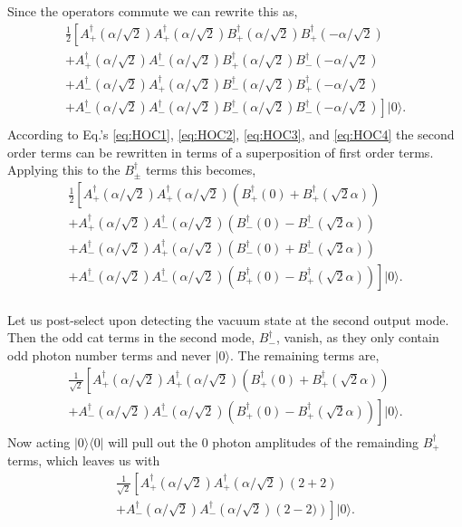 \documentclass[aps,prl,twocolumn,amsmath,amssymb,nofootinbib,superscriptaddress]{revtex4}
\newcommand{\bra}[1]{\langle#1|}
\newcommand{\ket}[1]{|#1\rangle}
\begin{document}
Since the operators commute we can rewrite this as,
\begin{eqnarray}
\frac{1}{2}\left[A_+^\dag(\alpha/\sqrt{2}) A_+^\dag(\alpha/\sqrt{2}) B_+^\dag(\alpha/\sqrt{2})  B_+^\dag(-\alpha/\sqrt{2}) \right. \nonumber \\
+ A_+^\dag(\alpha/\sqrt{2}) A_-^\dag(\alpha/\sqrt{2}) B_+^\dag(\alpha/\sqrt{2}) B_-^\dag(-\alpha/\sqrt{2}) \nonumber \\
+ A_-^\dag(\alpha/\sqrt{2})A_+^\dag(\alpha/\sqrt{2})B_-^\dag(\alpha/\sqrt{2})  B_+^\dag(-\alpha/\sqrt{2}) \nonumber \\
\left.+ A_-^\dag(\alpha/\sqrt{2}) A_-^\dag(\alpha/\sqrt{2})B_-^\dag(\alpha/\sqrt{2})B_-^\dag(-\alpha/\sqrt{2})\right] \ket{0}.\nonumber \\
\end{eqnarray}
According to Eq.'s \ref{eq:HOC1}, \ref{eq:HOC2}, \ref{eq:HOC3}, and \ref{eq:HOC4} the second order terms can be rewritten in terms of a superposition of first order terms. Applying this to the $B_{\pm}^{\dag}$ terms this becomes,
\begin{eqnarray}
\frac{1}{2}\left[A_+^\dag(\alpha/\sqrt{2}) A_+^\dag(\alpha/\sqrt{2}) \left(B_+^\dag(0)+  B_+^\dag(\sqrt{2}\alpha)\right) \right.\nonumber \\
+ A_+^\dag(\alpha/\sqrt{2}) A_-^\dag(\alpha/\sqrt{2}) \left(B_-^\dag(0)-  B_-^\dag(\sqrt{2}\alpha)\right) \nonumber \\
+ A_-^\dag(\alpha/\sqrt{2})A_+^\dag(\alpha/\sqrt{2})\left(B_-^\dag(0)+  B_-^\dag(\sqrt{2}\alpha)\right) \nonumber \\
\left.+ A_-^\dag(\alpha/\sqrt{2}) A_-^\dag(\alpha/\sqrt{2})\left(B_+^\dag(0)-  B_+^\dag(\sqrt{2}\alpha)\right)\right]\ket{0}.\nonumber \\
\end{eqnarray}

Let us post-select upon detecting the vacuum state at the second output mode. Then the odd cat terms in the second mode, $B_-^\dag$, vanish, as they only contain odd photon number terms and never $\ket{0}$. The remaining terms are,
\begin{eqnarray}
\frac{1}{\sqrt{2}}\left[A_+^\dag(\alpha/\sqrt{2}) A_+^\dag(\alpha/\sqrt{2}) \left(B_+^\dag(0)+  B_+^\dag(\sqrt{2}\alpha)\right) \right.\nonumber \\
\left.+ A_-^\dag(\alpha/\sqrt{2}) A_-^\dag(\alpha/\sqrt{2})\left(B_+^\dag(0)-  B_+^\dag(\sqrt{2}\alpha)\right)\right]\ket{0} .\nonumber \\
\end{eqnarray}
Now acting $\ket{0}\bra{0}$ will pull out the $0$ photon amplitudes of the remainding $B_+^{\dag}$ terms, which leaves us with
\begin{eqnarray}
\frac{1}{\sqrt{2}}\left[A_+^\dag(\alpha/\sqrt{2}) A_+^\dag(\alpha/\sqrt{2}) \left(2+ 2\right) \right.\nonumber \\
\left.+ A_-^\dag(\alpha/\sqrt{2}) A_-^\dag(\alpha/\sqrt{2})\left(2-  2)\right)\right]\ket{0}.\nonumber \\
\end{eqnarray}
\end{document}
